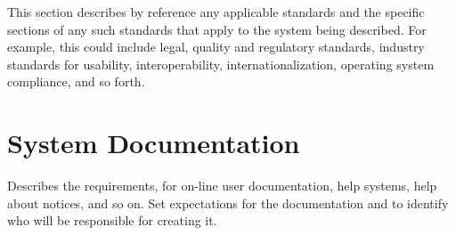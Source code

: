 This section describes by reference any applicable standards and the specific sections of any such standards that apply to the system being described. For example, this could include legal, quality and regulatory standards, industry standards for usability, interoperability, internationalization, operating system compliance, and so forth.

\section{System Documentation}

Describes the requirements, for on-line user documentation, help systems, help about notices, and so on. Set expectations for the documentation and to identify who will be responsible for creating it.


